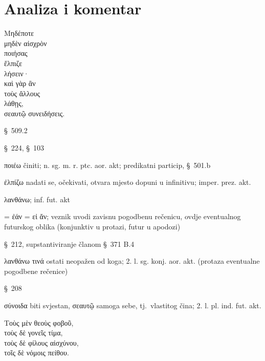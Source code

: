 \section*{Analiza i komentar}


{\large
\noindent Μηδέποτε \\
\tabto{2em} μηδὲν αἰσχρὸν \\
\tabto{2em} ποιήσας \\
ἔλπιζε \\
\tabto{2em} λήσειν·\\
καὶ γὰρ ἂν \\
\tabto{2em} τοὺς ἄλλους \\
\tabto{2em} λάθῃς, \\
σεαυτῷ συνειδήσεις.\\

}

\begin{description}[noitemsep]

\item[Μηδέποτε] §~509.2
\item[μηδὲν αἰσχρὸν] §~224, §~103
\item[ποιήσας] ποιέω činiti; n. sg. m. r. ptc. aor. akt; predikatni particip, §~501.b
\item[ἔλπιζε] ἐλπίζω nadati se, očekivati, otvara mjesto dopuni u infinitivu; imper. prez. akt.
\item[λήσειν] λανθάνω; inf. fut. akt
\item[ἂν] = ἐάν = εἰ ἄν; veznik uvodi zavisnu pogodbenu rečenicu, ovdje eventualnog futurskog oblika (konjunktiv u protazi, futur u apodozi)
\item[τοὺς ἄλλους] §~212, supstantiviranje članom §~371 B.4
\item[λάθῃς] λανθάνω τινά ostati neopažen od koga; 2. l. sg. konj. aor. akt. (protaza eventualne pogodbene rečenice)
\item[σεαυτῷ] §~208
\item[συνειδήσεις] σύνοιδα biti svjestan, σεαυτῷ samoga sebe, tj.\ vlastitog čina; 2. l. pl. ind. fut. akt.
\end{description}

{\large
\noindent Τοὺς μὲν θεοὺς φοβοῦ, \\
τοὺς δὲ γονεῖς τίμα, \\
τοὺς δὲ φίλους αἰσχύνου, \\
τοῖς δὲ νόμοις πείθου.\\

}

